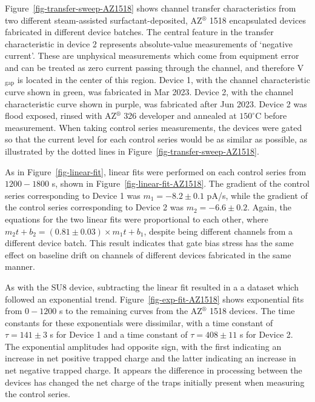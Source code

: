 \documentclass[
  a4paper,
]{scrbook}
\begin{document}
Figure~\ref{fig-transfer-sweep-AZ1518} shows channel transfer
characteristics from two different steam-assisted surfactant-deposited,
AZ\(^\circledR\) 1518 encapsulated devices fabricated in different
device batches. The central feature in the transfer characteristic in
device 2 represents absolute-value measurements of `negative current'.
These are unphysical measurements which come from equipment error and
can be treated as zero current passing through the channel, and
therefore V\(_{\textrm{gap}}\) is located in the center of this region.
Device 1, with the channel characteristic curve shown in green, was
fabricated in Mar 2023. Device 2, with the channel characteristic curve
shown in purple, was fabricated after Jun 2023. Device 2 was flood
exposed, rinsed with AZ\(^\circledR\) 326 developer and annealed at
\(150^\circ\)C before measurement. When taking control series
measurements, the devices were gated so that the current level for each
control series would be as similar as possible, as illustrated by the
dotted lines in Figure~\ref{fig-transfer-sweep-AZ1518}.

As in Figure~\ref{fig-linear-fit}, linear fits were performed on each
control series from \(1200-1800\) s, shown in
Figure~\ref{fig-linear-fit-AZ1518}. The gradient of the control series
corresponding to Device 1 was \(m_{1} = -8.2\pm0.1\) pA/s, while the
gradient of the control series corresponding to Device 2 was
\(m_{2} = -6.6\pm0.2\). Again, the equations for the two linear fits
were proportional to each other, where
\(m_{2}t + b_{2} = (0.81 \pm 0.03)\times m_{1}t + b_{1}\), despite being
different channels from a different device batch. This result indicates
that gate bias stress has the same effect on baseline drift on channels
of different devices fabricated in the same manner.

As with the SU8 device, subtracting the linear fit resulted in a a
dataset which followed an exponential trend.
Figure~\ref{fig-exp-fit-AZ1518} shows exponential fits from \(0-1200\) s
to the remaining curves from the AZ\(^\circledR\) 1518 devices. The time
constants for these exponentials were dissimilar, with a time constant
of \(\tau = 141 \pm 3\) s for Device 1 and a time constant of
\(\tau = 408 \pm 11\) s for Device 2. The exponential amplitudes had
opposite sign, with the first indicating an increase in net positive
trapped charge and the latter indicating an increase in net negative
trapped charge. It appears the difference in processing between the
devices has changed the net charge of the traps initially present when
measuring the control series.
\end{document}
